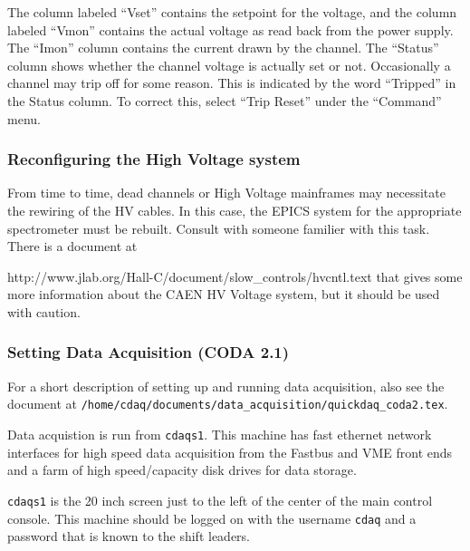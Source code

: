 The column labeled ``Vset'' contains the setpoint for the voltage,
and the column labeled ``Vmon'' contains the actual voltage as read
back from the power supply.  The ``Imon'' column contains the current
drawn by the channel.  The ``Status'' column shows whether the channel
voltage is actually set or not.  Occasionally a channel may trip off
for some reason. This is indicated by the word
``Tripped'' in the Status column.  To correct this, select ``Trip Reset''
under the ``Command'' menu.


\subsubsection{Reconfiguring the High Voltage system}
From time to time, dead channels or High Voltage mainframes may necessitate
the rewiring of the HV cables.  In this case, the EPICS system for the
appropriate spectrometer must be rebuilt.  Consult with someone familier
with this task.  There is a document at

{http://www.jlab.org/Hall-C/document/slow_controls/hvcntl.text}
that gives some more
information about the CAEN HV Voltage system, but it should be used with
caution.

\subsubsection{Setting Data Acquisition (CODA 2.1)}

For a short description of setting up and running data acquisition, also see the
document at \verb|/home/cdaq/documents/data_acquisition/quickdaq_coda2.tex|.

Data acquistion is run from \verb|cdaqs1|.  This machine
has fast ethernet
network interfaces for high speed data acquisition from the Fastbus and VME
front ends and a farm of high speed/capacity disk drives for data storage.

\verb|cdaqs1| is the 20 inch screen just to the left of the center
of the main control console.  This machine should be
logged on with the username \verb|cdaq| and a password that is known to
the shift leaders.\\



